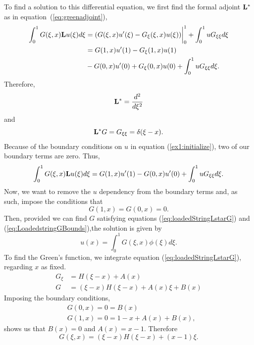     To find a solution to this differential equation, we first find the formal adjoint \(\mathrm{\bf{L^*}}\) as in equation~(\ref{eq:greenadjoint}), 
    \begin{equation}
        \begin{split}
            \int_{0}^{1} G(\xi, x)\mathrm{\bf{L}} u(\xi) d\xi  &= (G(\xi, x)u'(\xi)-G_\xi (\xi, x)u(\xi))\biggr\rvert_0^1 + \int_{0}^{1} uG_{\xi\xi}d\xi\\
            &= G(1, x)u'(1) - G_\xi(1, x)u(1) \\&- G(0, x)u'(0) + G_\xi(0,x)u(0) + \int_{0}^{1} uG_{\xi\xi}d\xi.
        \end{split}
    \end{equation}
    Therefore, 
    \begin{equation}
        \mathrm{\bf{L^*}} = \frac{d^2}{d\xi^2}
    \end{equation}
    and 
    \begin{equation}\label{eq:loadedStringLstarG}
        \mathrm{\bf{L^*}} G = G_{\xi\xi} = \delta(\xi-x).
    \end{equation}
    Because of the boundary conditions on \(u\) in equation (\ref{ex1:initialize}), two of our boundary terms are zero. Thus,
    \begin{equation}
        \int_{0}^{1} G(\xi, x)\mathrm{\bf{L}} u(\xi) d\xi = G(1, x)u'(1) - G(0, x)u'(0) + \int_{0}^{1} uG_{\xi\xi}d\xi.
    \end{equation}
    Now, we want to remove the \(u\) dependency from the boundary terms and, as such, impose the conditions that
    \begin{equation}\label{eq:LoadedstringGBounds}
        G(1,x) = G(0,x) = 0.
    \end{equation}
    Then, provided we can find \(G\) satisfying equations (\ref{eq:loadedStringLstarG}) and (\ref{eq:LoadedstringGBounds}),the solution is given by 
    \begin{equation}\label{eq:loadSln}
        u(x) = \int_0^1 G(\xi,x)\phi(\xi)d\xi.
    \end{equation}
    To find the Green's function, we integrate equation (\ref{eq:loadedStringLstarG}), regarding \(x\) as fixed.
    \begin{equation}
        \begin{split}
            G_\xi &= H(\xi-x) + A(x)\\
            G &= (\xi - x)H(\xi-x)+A(x)\xi +B(x)
        \end{split}
    \end{equation}
    Imposing the boundary conditions, 
    \begin{equation}
        \begin{split}
            &G(0,x) = 0 = B(x)\\
            &G(1,x) = 0 =  1 - x + A(x) + B(x),
        \end{split}
    \end{equation}
    shows us that \(B(x)=0\) and  \(A(x)=x-1\). Therefore
    \begin{equation}\label{eq:LoadGf}
        G(\xi,x) = (\xi-x)H(\xi-x) + (x-1)\xi.
    \end{equation}

